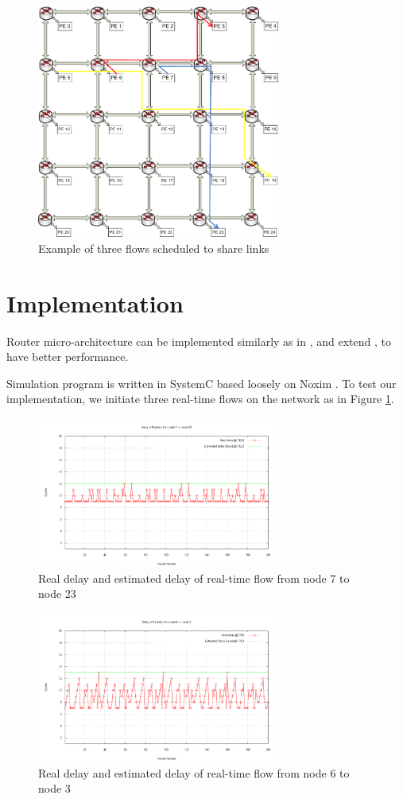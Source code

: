\documentclass[conference, twocolumn]{IEEEtran}
\theoremstyle{definition}
\begin{document}
\begin{figure}[htp]
\centering
\includegraphics[width=8cm]{pics/Example.png}
\caption[Three flows example.]
{Example of three flows scheduled to share links}\label{fig:3FlowsEx}
\end{figure}

\section{Implementation}
Router micro-architecture can be implemented similarly as in
\cite{Rexford98arouter},\cite{ZhangService} and extend \cite{PehDelayModel},
\cite{PehSpecPipeR} to have better performance.

Simulation program is written in SystemC based loosely on Noxim \cite{Noxim}.
To test our implementation, we initiate three real-time flows on the network as
in Figure \ref{fig:3FlowsEx}.

\begin{figure}[htp]
\centering
\includegraphics[width=8cm]{pics/PE23.png}
\caption[Flow from node 7 to node 23.]
{Real delay and estimated delay of real-time flow from node
7 to node 23}\label{fig:PE7PE23}
\end{figure}

\begin{figure}[htp]
\centering
\includegraphics[width=8cm]{pics/PE3.png}
\caption[Three flows example.]
{Real delay and estimated delay of real-time flow from node
6 to node 3}\label{fig:PE6PE3}
\end{figure}
\end{document}
